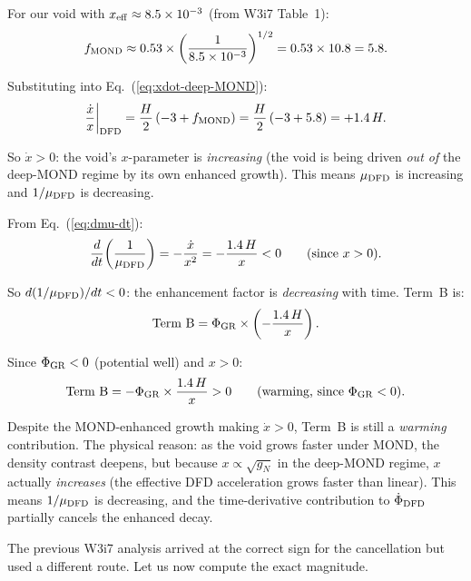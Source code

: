 \documentclass[11pt,a4paper]{article}
\newcommand{\mufd}{\mu_{\rm DFD}}
\newcommand{\ee}[1]{\times 10^{#1}}
\newcounter{findingctr}
\newenvironment{finding}[1][]{%
  \refstepcounter{findingctr}%
  \begin{tcolorbox}[colback=blue!3!white, colframe=blue!50!black,
    title=\textbf{Finding \thefindingctr: #1}]
}{%
  \end{tcolorbox}%
}
\begin{document}
For our void with $x_{\rm eff} \approx 8.5\ee{-3}$ (from W3i7
Table~1):
\begin{equation}
f_{\rm MOND} \approx 0.53\times\left(\frac{1}{8.5\ee{-3}}\right)^{1/2}
= 0.53\times 10.8 = 5.8.
\label{eq:f-MOND-value}
\end{equation}

Substituting into Eq.~(\ref{eq:xdot-deep-MOND}):
\begin{equation}
\frac{\dot{x}}{x}\bigg|_{\rm DFD}
= \frac{H}{2}\,(-3 + f_{\rm MOND})
= \frac{H}{2}\,(-3 + 5.8)
= +1.4\,H.
\label{eq:xdot-value}
\end{equation}

So $\dot{x} > 0$: the void's $x$-parameter is \emph{increasing}
(the void is being driven \emph{out of} the deep-MOND regime by its
own enhanced growth). This means $\mufd$ is increasing and $1/\mufd$
is decreasing.

From Eq.~(\ref{eq:dmu-dt}):
\begin{equation}
\frac{d}{dt}\!\left(\frac{1}{\mufd}\right)
= -\frac{\dot{x}}{x^2}
= -\frac{1.4\,H}{x} < 0
\qquad (\text{since } x > 0).
\label{eq:dmu-dt-value}
\end{equation}

So $d(1/\mufd)/dt < 0$: the enhancement factor is \emph{decreasing}
with time. Term~B is:
\begin{equation}
\text{Term B} = \Phi_{\rm GR}\times\left(-\frac{1.4\,H}{x}\right).
\end{equation}

Since $\Phi_{\rm GR} < 0$ (potential well) and $x > 0$:
\begin{equation}
\text{Term B} = -\Phi_{\rm GR}\times\frac{1.4\,H}{x} > 0
\qquad (\text{warming, since } \Phi_{\rm GR} < 0).
\end{equation}

\begin{finding}[Term B Sign Confirmed: Still Warming]
\label{find:term-B-sign}
Despite the MOND-enhanced growth making $\dot{x} > 0$, Term~B is
still a \emph{warming} contribution. The physical reason: as the void
grows faster under MOND, the density contrast deepens, but because
$x \propto \sqrt{g_N}$ in the deep-MOND regime, $x$ actually
\emph{increases} (the effective DFD acceleration grows faster than
linear). This means $1/\mufd$ is decreasing, and the time-derivative
contribution to $\dot{\Phi}_{\rm DFD}$ partially cancels the enhanced
decay.

The previous W3i7 analysis arrived at the correct sign for the
cancellation but used a different route. Let us now compute the
exact magnitude.
\end{finding}
\end{document}
